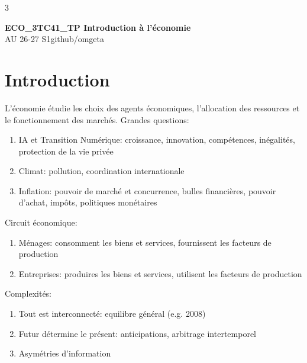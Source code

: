 \documentclass[12pt, a4paper]{article}
\newcommand{\mytitle}{ECO\_3TC41\_TP Introduction à l'économie}
\newcommand{\myauthor}{github/omgeta}
\newcommand{\mydate}{AU 26-27 S1}
\begin{document}
\raggedright
\footnotesize
\begin{multicols*}{3}
\setlength{\premulticols}{1pt}
\setlength{\postmulticols}{1pt}
\setlength{\multicolsep}{1pt}
\setlength{\columnsep}{2pt}

{\normalsize{\textbf{\mytitle}}}\\
{\footnotesize{\mydate\hspace{2pt}\textemdash\hspace{2pt}\myauthor}}
\section{Introduction}

L'économie étudie les choix des agents économiques, l'allocation des ressources et le fonctionnement des marchés. Grandes questions:
\begin{enumerate}[\roman*.]
  \item IA et Transition Numérique: croissance, innovation, compétences, inégalités, protection de la vie privée 
  \item Climat: pollution, coordination internationale
  \item Inflation: pouvoir de marché et concurrence, bulles financières, pouvoir d’achat, impôts, politiques monétaires
\end{enumerate}

Circuit économique:
\begin{enumerate}[\roman*.]
  \item Ménages: consomment les biens et services, fournissent les facteurs de production
  \item Entreprises: produires les biens et services, utilisent les facteurs de production
\end{enumerate}

Complexités:
\begin{enumerate}[\roman*.]
  \item Tout est interconnecté: equilibre général (e.g. 2008)
  \item Futur détermine le présent: anticipations, arbitrage intertemporel
  \item Asymétries d'information
\end{enumerate}


\end{multicols*}
\end{document}
